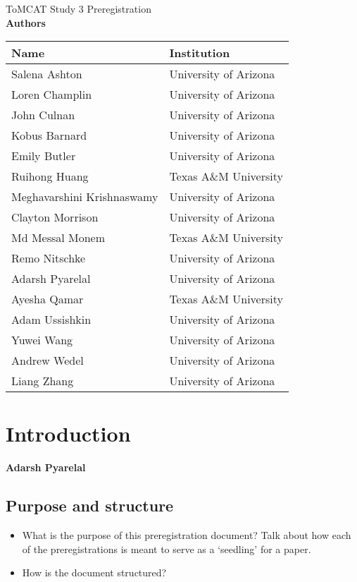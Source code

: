 \documentclass[oneside,9pt]{memoir}
\begin{document}
\begin{center}
    {\LARGE ToMCAT Study 3 Preregistration}\\
    \bigskip
    \textbf{Authors}
\end{center}

\begin{tabular}{ll}
    \toprule
    Name & Institution \\\midrule
    Salena Ashton & University of Arizona\\
    Loren Champlin & University of Arizona\\
    John Culnan & University of Arizona\\
    Kobus Barnard & University of Arizona\\
    Emily Butler & University of Arizona\\
    Ruihong Huang & Texas A\&M University \\
    Meghavarshini Krishnaswamy & University of Arizona\\
    Clayton Morrison & University of Arizona\\
    Md Messal Monem & Texas A\&M University \\
    Remo Nitschke & University of Arizona\\
    Adarsh Pyarelal & University of Arizona\\
    Ayesha Qamar & Texas A\&M University \\
    Adam Ussishkin& University of Arizona\\
    Yuwei Wang & University of Arizona\\
    Andrew Wedel & University of Arizona\\
    Liang Zhang & University of Arizona\\
    \bottomrule
\end{tabular}

\bigskip

\tableofcontents* 

\chapter{Introduction}
\textbf{Adarsh Pyarelal}

\section{Purpose and structure}
\begin{itemize}
    \item What is the purpose of this preregistration document? Talk about how
        each of the preregistrations is meant to serve as a `seedling' for a
        paper.
    \item How is the document structured?
\end{itemize}
\end{document}
